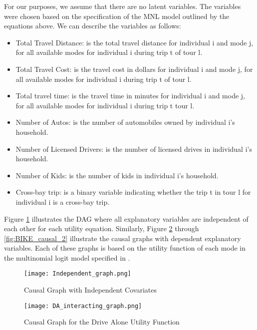 For our purposes, we assume that there are no latent variables.
The variables were chosen based on the specification of the MNL model outlined by the equations above.
We can describe the variables as follows:

\begin{itemize}
  \item Total Travel Distance: is the total travel distance for individual i and mode j, for all available modes for individual i during trip t of tour l.
  \item Total Travel Cost: is the travel cost in dollars for individual i and mode j, for all available modes for individual i during trip t of tour l.
  \item Total travel time: is the travel time in minutes for individual i and mode j, for all available modes for individual i during trip t tour l.
  \item Number of Autos: is the number of automobiles owned by individual i's household.
  \item Number of Licensed Drivers: is the number of licensed drives in individual i's household.
  \item Number of Kids: is the number of kids in individual i's household.
  \item Cross-bay trip: is a binary variable indicating whether the trip t in tour l for individual i is a cross-bay trip.
\end{itemize}

Figure \ref{fig:IND_GRAPH} illustrates the DAG where all explanatory variables are independent of each other for each utility equation.
Similarly, Figure \ref{fig:DA_causal_2} through \ref{fig:BIKE_causal_2} illustrate the causal graphs with dependent explanatory variables.
Each of these graphs is based on the utility function of each mode in the multinomial logit model specified in \citet{brathwaite_asymmetric}.

\begin{figure}
   \centering
   \texttt{[image: Independent\_graph.png]}
   \caption{Causal Graph with Independent Covariates}
   \label{fig:IND_GRAPH}
\end{figure}

\begin{figure}
   \centering
   \texttt{[image: DA\_interacting\_graph.png]}
   \caption{Causal Graph for the Drive Alone Utility Function}
   \label{fig:DA_causal_2}
\end{figure}

